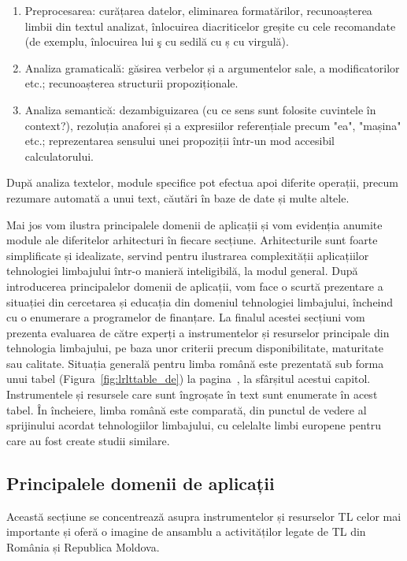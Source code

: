 \begin{multicols}{2}
\begin{enumerate}
\item Preprocesarea: curățarea datelor, eliminarea formatărilor, recunoașterea limbii din textul analizat, înlocuirea diacriticelor greșite cu cele recomandate (de exemplu, înlocuirea lui ş cu sedilă cu ș cu virgulă).
\item Analiza gramaticală: găsirea verbelor și a argumentelor sale, a modificatorilor etc.; recunoașterea structurii propoziționale.
\item Analiza semantică: dezambiguizarea (cu ce sens sunt folosite cuvintele în context?), rezoluția anaforei și a expresiilor referențiale precum "ea", "mașina" etc.; reprezentarea sensului unei propoziții \mbox{într-un} mod accesibil calculatorului.
\end{enumerate}
După analiza textelor, module specifice pot efectua apoi diferite operații, precum rezumare automată a unui text, căutări în baze de date și multe altele. 

Mai jos vom ilustra principalele domenii de aplicații și vom evidenția anumite module ale diferitelor arhitecturi în fiecare secțiune. Arhitecturile sunt foarte simplificate și idealizate, servind pentru ilustrarea complexității aplicațiilor tehnologiei limbajului \mbox{într-o} manieră inteligibilă, la modul general. După introducerea principalelor domenii de aplicații, vom face o scurtă prezentare a situației din cercetarea și educația din domeniul tehnologiei limbajului, încheind cu o enumerare a programelor de finanțare. La finalul acestei secțiuni vom prezenta evaluarea de către experți a instrumentelor și resurselor principale din tehnologia limbajului, pe baza unor criterii precum disponibilitate, maturitate sau calitate. Situația generală pentru limba română este prezentată sub forma unui tabel (Figura~\ref{fig:lrlttable_de}) la pagina~\pageref{fig:lrlttable_de}, la sfârșitul acestui capitol. Instrumentele și resursele care sunt îngroșate în text sunt enumerate în acest tabel. În încheiere, limba română este comparată, din punctul de vedere al sprijinului acordat tehnologiilor limbajului, cu celelalte limbi europene pentru care au fost create studii similare.

\subsection{Principalele domenii de aplicații} 

Această secțiune se concentrează asupra instrumentelor și resurselor TL celor mai importante și oferă o imagine de ansamblu a activităților legate de TL din România și Republica Moldova.

\end{multicols}
